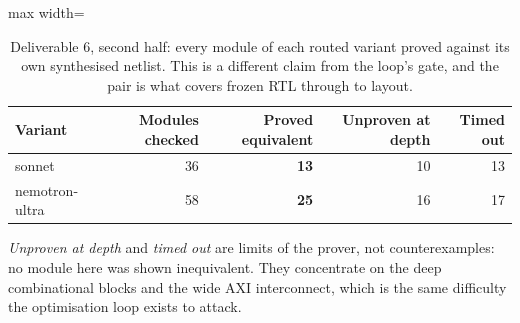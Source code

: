 \begin{table}[htbp]
  \centering
  \footnotesize
  \caption{Deliverable 6, second half: every module of each routed variant proved against its own synthesised netlist. This is a different claim from the loop's gate, and the pair is what covers frozen RTL through to layout.}
  \label{tab:eqynetlist}
  \begin{adjustbox}{max width=\textwidth}
  \begin{tabular}{lrrrr}
    \toprule
    \textbf{Variant} & \textbf{Modules checked} & \textbf{Proved equivalent} & \textbf{Unproven at depth} & \textbf{Timed out} \\
    \midrule
    sonnet & 36 & \textbf{13} & 10 & 13 \\
    nemotron-ultra & 58 & \textbf{25} & 16 & 17 \\
    \bottomrule
  \end{tabular}
  \end{adjustbox}
  \par\smallskip\footnotesize\raggedright \emph{Unproven at depth} and \emph{timed out} are limits of the prover, not counterexamples: no module here was shown inequivalent. They concentrate on the deep combinational blocks and the wide AXI interconnect, which is the same difficulty the optimisation loop exists to attack.
\end{table}
